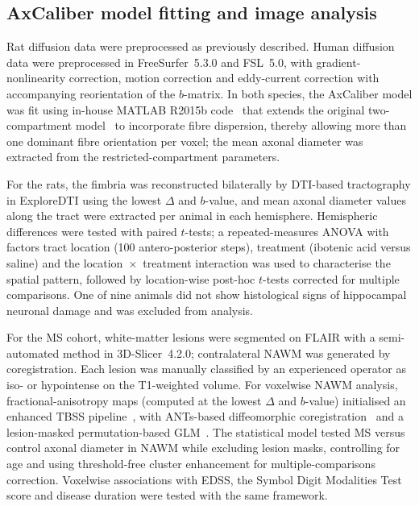 \documentclass[11pt]{article}
\begin{document}
\subsection{AxCaliber model fitting and image analysis}
Rat diffusion data were preprocessed as previously described. Human diffusion data were preprocessed in FreeSurfer~5.3.0 and FSL~5.0, with gradient-nonlinearity correction, motion correction and eddy-current correction with accompanying reorientation of the $b$-matrix. In both species, the AxCaliber model was fit using in-house MATLAB R2015b code~\cite{desantis2019whole} that extends the original two-compartment model~\cite{assaf2008axcaliber} to incorporate fibre dispersion, thereby allowing more than one dominant fibre orientation per voxel; the mean axonal diameter was extracted from the restricted-compartment parameters.

For the rats, the fimbria was reconstructed bilaterally by DTI-based tractography in ExploreDTI using the lowest $\Delta$ and $b$-value, and mean axonal diameter values along the tract were extracted per animal in each hemisphere. Hemispheric differences were tested with paired $t$-tests; a repeated-measures ANOVA with factors tract location (100 antero-posterior steps), treatment (ibotenic acid versus saline) and the location~$\times$~treatment interaction was used to characterise the spatial pattern, followed by location-wise post-hoc $t$-tests corrected for multiple comparisons. One of nine animals did not show histological signs of hippocampal neuronal damage and was excluded from analysis.

For the MS cohort, white-matter lesions were segmented on FLAIR with a semi-automated method in 3D-Slicer~4.2.0; contralateral NAWM was generated by coregistration. Each lesion was manually classified by an experienced operator as iso- or hypointense on the T1-weighted volume. For voxelwise NAWM analysis, fractional-anisotropy maps (computed at the lowest $\Delta$ and $b$-value) initialised an enhanced TBSS pipeline~\cite{smith2006tbss}, with ANTs-based diffeomorphic coregistration~\cite{klein2009evaluation} and a lesion-masked permutation-based GLM~\cite{winkler2014permutation}. The statistical model tested MS versus control axonal diameter in NAWM while excluding lesion masks, controlling for age and using threshold-free cluster enhancement for multiple-comparisons correction. Voxelwise associations with EDSS, the Symbol Digit Modalities Test score and disease duration were tested with the same framework.
\end{document}
